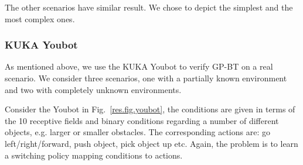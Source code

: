 %
%
%
%
%
%
%
%
%
%
The other scenarios have similar result. We chose to depict the simplest and the most complex ones.



\subsubsection{KUKA Youbot}
As mentioned above, we use the KUKA Youbot to verify GP-BT on a real scenario. We consider three scenarios, one with a partially known environment and two with completely unknown environments.

Consider the Youbot in Fig.~\ref{res.fig.youbot}, the conditions are given in terms of the 10 receptive fields and binary conditions regarding a number of different objects, e.g. larger or smaller obstacles. The corresponding actions are: go left/right/forward, push object, pick object up etc. Again, the problem is to learn a switching policy mapping conditions to actions.



